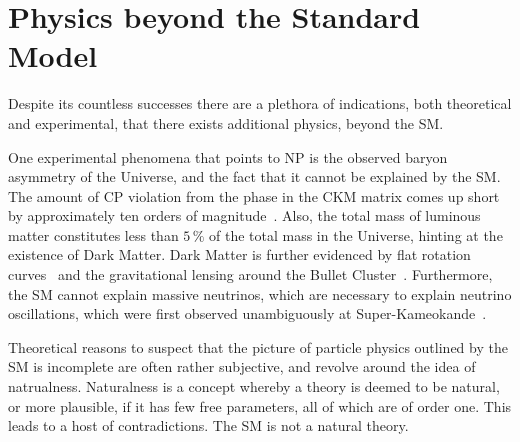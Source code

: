 \section{Physics beyond the Standard Model}

Despite its countless successes there are a plethora of indications, both theoretical and
experimental, that there exists additional physics, beyond the SM.

One experimental phenomena that points to NP is the observed baryon asymmetry of the Universe, and
the fact that it cannot be explained by the SM.
The amount of CP violation from the phase in the CKM matrix comes up short by approximately ten
orders of magnitude~\cite{Cline:2006ts,Huet:1994jb}.
Also, the total mass of luminous matter constitutes less than $5\,\%$ of the
total mass in the Universe, hinting at the existence of Dark Matter.
Dark Matter is further evidenced by flat rotation
curves~\cite{1970ApJ...159..379R,1980ApJ...238..471R} and the gravitational lensing around the
Bullet Cluster~\cite{Markevitch:2003at}.
Furthermore, the SM cannot explain massive neutrinos, which are necessary to explain neutrino
oscillations, which were first observed unambiguously at
Super-Kameokande~\cite{PhysRevLett.81.1562}.

Theoretical reasons to suspect that the picture of particle physics outlined by the
SM is incomplete are often rather subjective, and revolve around the idea of natrualness.
Naturalness is a concept whereby a theory is deemed to be natural, or more plausible, if it has few
free parameters, all of which are of order one.
This leads to a host of contradictions.
The SM is not a natural theory.



